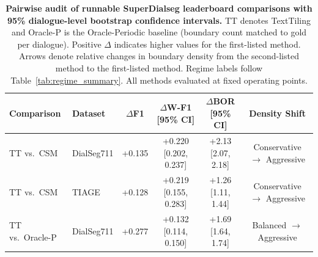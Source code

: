 \documentclass{article}
\begin{document}
\begin{table}[t]
  \centering
  \small
  \setlength{\tabcolsep}{6pt}
  \begin{tabular}{llcccc}
    \toprule
    Comparison & Dataset &
    $\Delta$F1 &
    \parbox[c]{1.9cm}{\centering $\Delta$W-F1\\[0.5ex][95\% CI]} &
    \parbox[c]{1.9cm}{\centering $\Delta$BOR\\[0.5ex][95\% CI]} &
    Density Shift \\
    \midrule
    TT vs.\ CSM & DialSeg711 &
    +0.135 &
    \parbox[c]{1.9cm}{\centering +0.220\\[0.5ex][0.202, 0.237]} &
    \parbox[c]{1.9cm}{\centering +2.13\\[0.5ex][2.07, 2.18]} &
    \parbox[t]{2.6cm}{\raggedright Conservative $\rightarrow$\\Aggressive} \\
    \addlinespace[4pt]
    TT vs.\ CSM & TIAGE &
    +0.128 &
    \parbox[c]{1.9cm}{\centering +0.219\\[0.5ex][0.155, 0.283]} &
    \parbox[c]{1.9cm}{\centering +1.26\\[0.5ex][1.11, 1.44]} &
    \parbox[t]{2.6cm}{\raggedright Conservative $\rightarrow$\\Aggressive} \\
    \addlinespace[4pt]
    TT vs.\ Oracle-P & DialSeg711 &
    +0.277 &
    \parbox[c]{1.9cm}{\centering +0.132\\[0.5ex][0.114, 0.150]} &
    \parbox[c]{1.9cm}{\centering +1.69\\[0.5ex][1.64, 1.74]} &
    \parbox[t]{2.6cm}{\raggedright Balanced $\rightarrow$\\Aggressive} \\
    \bottomrule
  \end{tabular}
  \caption{\textbf{Pairwise audit of runnable SuperDialseg leaderboard comparisons with
      95\% dialogue-level bootstrap confidence intervals.} TT denotes TextTiling and
    Oracle-P is the Oracle-Periodic baseline (boundary count matched to gold per dialogue). Positive $\Delta$ indicates
    higher values for the first-listed method. Arrows denote relative changes in
    boundary density from the second-listed method to the first-listed method.
    Regime labels follow Table~\ref{tab:regime_summary}.
    All methods evaluated at fixed operating points.}
  \label{tab:leaderboard-deltas}
\end{table}
\end{document}
